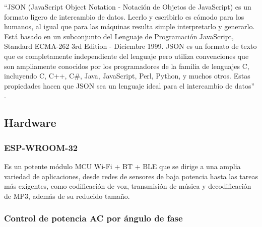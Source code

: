 ``JSON (JavaScript Object Notation - Notación de Objetos de JavaScript) es un formato ligero de intercambio de datos. Leerlo y escribirlo es cómodo para los humanos, al igual que para las máquinas resulta simple interpretarlo y generarlo. Está basado en un subconjunto del Lenguaje de Programación JavaScript, Standard ECMA-262 3rd Edition - Diciembre 1999. JSON es un formato de texto que es completamente independiente del lenguaje pero utiliza convenciones que son ampliamente conocidos por los programadores de la familia de lenguajes C, incluyendo C, C++, C\#, Java, JavaScript, Perl, Python, y muchos otros. Estas propiedades hacen que JSON sea un lenguaje ideal para el intercambio de datos'' \cite{JSON}.\\

\subsection{Hardware}

\subsubsection{ESP-WROOM-32}

Es un potente módulo MCU Wi-Fi + BT + BLE que se dirige a una amplia variedad de aplicaciones, desde redes de sensores de baja potencia hasta las tareas más exigentes, como codificación de voz, transmisión de música y decodificación de MP3, además de su reducido tamaño. \cite{EW32}\\

%

\subsubsection{Control de potencia AC por ángulo de fase}

